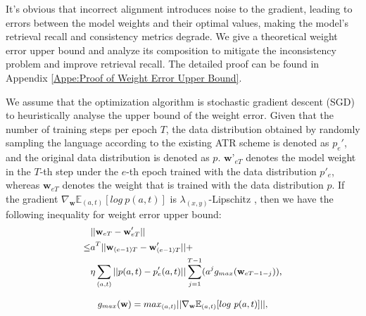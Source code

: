 It's obvious that incorrect alignment introduces noise to the gradient, leading to errors between the model weights and their optimal values, making the model's retrieval recall and consistency metrics degrade. We give a theoretical weight error upper bound and analyze its composition to mitigate the inconsistency problem and improve retrieval recall. The detailed proof can be found in Appendix \ref{Appe:Proof of Weight Error Upper Bound}.


We assume that the optimization algorithm is stochastic gradient descent (SGD) \cite{ru2025we} to heuristically analyse the upper bound of the weight error. Given that the number of training steps per epoch $T$, the data distribution obtained by randomly sampling the language according to the existing ATR scheme is denoted as $p_e'$, and the original data distribution is denoted as $p$. $\mathbf w’_{eT}$ denotes the model weight in the $T$-th step under the $e$-th epoch trained with the data distribution $p'_e$, whereas $\mathbf w_{eT}$ denotes the weight that is trained with the data distribution $p$. If the gradient $\nabla_\mathbf w\mathbb{E}_{(a,t)}[log\ p(a,t)]$ is $\lambda_{(x,y)}$-Lipschitz \cite{bethune2023dp}, then we have the following inequality for weight error upper bound:
\begin{equation}
\label{Eq:weight error}
\small
\begin{aligned}
&||\mathbf w_{eT}-\mathbf w'_{eT}||\\
\leq & a^T||\mathbf w_{(e-1)T}-\mathbf w'_{(e-1)T}||+\\
&\eta \sum_{(a,t)}||p(a,t)-p'_e(a,t)||\sum^{T-1}_{j=1}(a^jg_{max}(\mathbf w_{eT-1-j})),
\end{aligned}
\end{equation}

\begin{equation}
\small
\begin{aligned}
g_{max}(\mathbf w)=max_{(a,t)}||\nabla_\mathbf w\mathbb{E}_{(a,t)}[log\ p(a,t)]||,
\end{aligned}
\end{equation}

